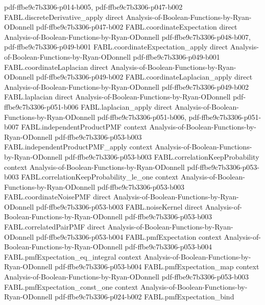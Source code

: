 \begin{theorem}
  {pdf-ffbe9c7b3306-p014-b005,
    pdf-ffbe9c7b3306-p047-b002}
\proofstep
  {FABL.discreteDerivative_apply}
  {direct}
  {Analysis-of-Boolean-Functions-by-Ryan-ODonnell}
  {pdf-ffbe9c7b3306-p047-b002}
\proofstep
  {FABL.coordinateExpectation}
  {direct}
  {Analysis-of-Boolean-Functions-by-Ryan-ODonnell}
  {pdf-ffbe9c7b3306-p048-b007,
    pdf-ffbe9c7b3306-p049-b001}
\proofstep
  {FABL.coordinateExpectation_apply}
  {direct}
  {Analysis-of-Boolean-Functions-by-Ryan-ODonnell}
  {pdf-ffbe9c7b3306-p049-b001}
\proofstep
  {FABL.coordinateLaplacian}
  {direct}
  {Analysis-of-Boolean-Functions-by-Ryan-ODonnell}
  {pdf-ffbe9c7b3306-p049-b002}
\proofstep
  {FABL.coordinateLaplacian_apply}
  {direct}
  {Analysis-of-Boolean-Functions-by-Ryan-ODonnell}
  {pdf-ffbe9c7b3306-p049-b002}
\proofstep
  {FABL.laplacian}
  {direct}
  {Analysis-of-Boolean-Functions-by-Ryan-ODonnell}
  {pdf-ffbe9c7b3306-p051-b006}
\proofstep
  {FABL.laplacian_apply}
  {direct}
  {Analysis-of-Boolean-Functions-by-Ryan-ODonnell}
  {pdf-ffbe9c7b3306-p051-b006,
    pdf-ffbe9c7b3306-p051-b007}
\proofstep
  {FABL.independentProductPMF}
  {context}
  {Analysis-of-Boolean-Functions-by-Ryan-ODonnell}
  {pdf-ffbe9c7b3306-p053-b003}
\proofstep
  {FABL.independentProductPMF_apply}
  {context}
  {Analysis-of-Boolean-Functions-by-Ryan-ODonnell}
  {pdf-ffbe9c7b3306-p053-b003}
\proofstep
  {FABL.correlationKeepProbability}
  {context}
  {Analysis-of-Boolean-Functions-by-Ryan-ODonnell}
  {pdf-ffbe9c7b3306-p053-b003}
\proofstep
  {FABL.correlationKeepProbability_le_one}
  {context}
  {Analysis-of-Boolean-Functions-by-Ryan-ODonnell}
  {pdf-ffbe9c7b3306-p053-b003}
\proofstep
  {FABL.coordinateNoisePMF}
  {direct}
  {Analysis-of-Boolean-Functions-by-Ryan-ODonnell}
  {pdf-ffbe9c7b3306-p053-b003}
\proofstep
  {FABL.noiseKernel}
  {direct}
  {Analysis-of-Boolean-Functions-by-Ryan-ODonnell}
  {pdf-ffbe9c7b3306-p053-b003}
\proofstep
  {FABL.correlatedPairPMF}
  {direct}
  {Analysis-of-Boolean-Functions-by-Ryan-ODonnell}
  {pdf-ffbe9c7b3306-p053-b004}
\proofstep
  {FABL.pmfExpectation}
  {context}
  {Analysis-of-Boolean-Functions-by-Ryan-ODonnell}
  {pdf-ffbe9c7b3306-p053-b004}
\proofstep
  {FABL.pmfExpectation_eq_integral}
  {context}
  {Analysis-of-Boolean-Functions-by-Ryan-ODonnell}
  {pdf-ffbe9c7b3306-p053-b004}
\proofstep
  {FABL.pmfExpectation_map}
  {context}
  {Analysis-of-Boolean-Functions-by-Ryan-ODonnell}
  {pdf-ffbe9c7b3306-p053-b003}
\proofstep
  {FABL.pmfExpectation_const_one}
  {context}
  {Analysis-of-Boolean-Functions-by-Ryan-ODonnell}
  {pdf-ffbe9c7b3306-p024-b002}
\proofstep
  {FABL.pmfExpectation_bind}

\end{theorem}
